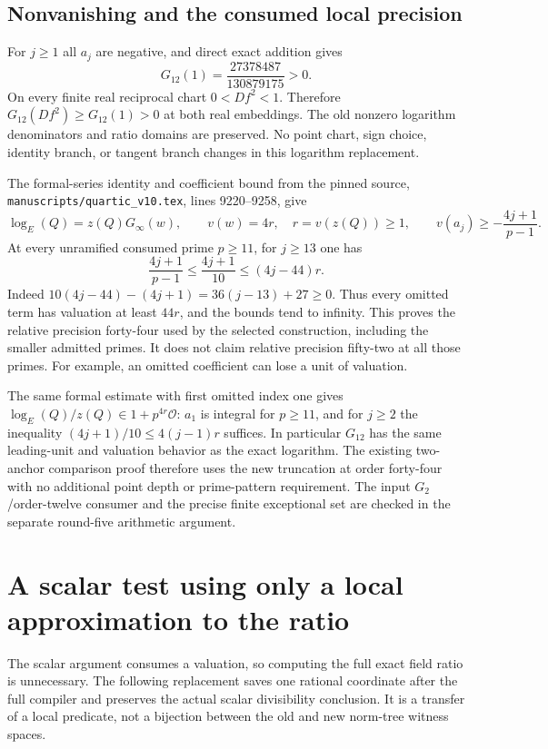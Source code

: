 \subsection{Nonvanishing and the consumed local precision}

For $j\ge1$ all $a_j$ are negative, and direct exact addition gives
\[
 G_{12}(1)=\frac{27378487}{130879175}>0.
\]
On every finite real reciprocal chart $0<Df^2<1$. Therefore
$G_{12}(Df^2)\ge G_{12}(1)>0$ at both real embeddings. The old
nonzero logarithm denominators and ratio domains are preserved.
No point chart, sign choice, identity branch, or tangent branch changes
in this logarithm replacement.

The formal-series identity and coefficient bound from the pinned
source, \texttt{manuscripts/quartic\_v10.tex}, lines 9220--9258, give
\[
 \log_E(Q)=z(Q)G_\infty(w),\qquad
 v(w)=4r,\quad r=v(z(Q))\ge1,\qquad
 v(a_j)\ge-\frac{4j+1}{p-1}.
\]
At every unramified consumed prime $p\ge11$, for $j\ge13$ one has
\[
 \frac{4j+1}{p-1}\le\frac{4j+1}{10}
 \le(4j-44)r.
\]
Indeed $10(4j-44)-(4j+1)=36(j-13)+27\ge0$.
Thus every omitted term has valuation at least $44r$, and the bounds
tend to infinity. This proves the relative precision forty-four used
by the selected construction, including the smaller admitted primes.
It does not claim relative precision fifty-two at all those primes.
For example, an omitted coefficient can lose a unit of valuation.

The same formal estimate with first omitted index one gives
$\log_E(Q)/z(Q)\in1+p^{4r}\mathcal O$: $a_1$ is integral for $p\ge11$,
and for $j\ge2$ the inequality
$(4j+1)/10\le4(j-1)r$ suffices. In particular $G_{12}$ has the same
leading-unit and valuation behavior as the exact logarithm.
The existing two-anchor comparison proof therefore uses the new
truncation at order forty-four with no additional point depth or
prime-pattern requirement. The input $G_2$/order-twelve consumer and
the precise finite exceptional set are checked in the separate
round-five arithmetic argument.

\section{A scalar test using only a local approximation to the ratio}

The scalar argument consumes a valuation, so computing the full exact
field ratio is unnecessary. The following replacement saves one
rational coordinate after the full compiler and preserves the actual
scalar divisibility conclusion. It is a transfer of a local predicate,
not a bijection between the old and new norm-tree witness spaces.

